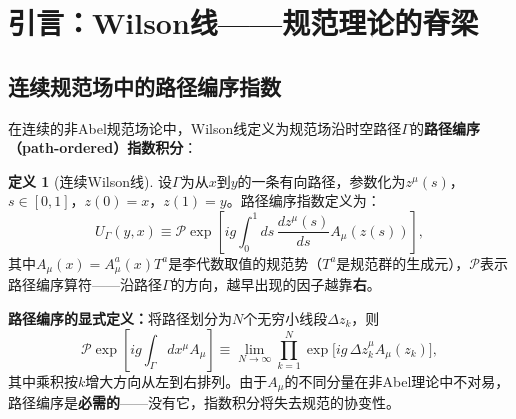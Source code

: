 \documentclass[12pt,a4paper]{ctexart}
\theoremstyle{definition}
\newtheorem{definition}{定义}[section]
\begin{document}
\begin{abstract}
最后，本文讨论了HYP涂抹（Hypercubic Smeared Link）对Wilson线的改进效果、规范固定精度对长Wilson线的影响（定量给出$\delta_F = 10^{-8}$精度下在$a=0.03$~fm格距上1.2~fm Wilson线可达12\%偏差的实证数据），以及Wilson线在重夸克有效理论（HQET）中的核心角色。

全篇以统一的数学语言（路径编序指数、规范变换性质、谱表示）将分散在本库各文献中的Wilson线知识编织成一个有机整体，为读者提供了从经典禁闭物理到前沿部分子结构的完整Wilson线理论图景。
\end{abstract}

\tableofcontents
\newpage

\section{引言：Wilson线——规范理论的脊梁}

\subsection{连续规范场中的路径编序指数}

在连续的非Abel规范场论中，Wilson线定义为规范场沿时空路径$\Gamma$的\textbf{路径编序（path-ordered）指数积分}：

\begin{definition}[连续Wilson线]
设$\Gamma$为从$x$到$y$的一条有向路径，参数化为$z^\mu(s)$，$s\in[0,1]$，$z(0)=x$，$z(1)=y$。路径编序指数定义为：
\begin{equation}
\boxed{U_\Gamma(y,x) \equiv \mathcal{P}\exp\!\left[ig\int_0^1 ds\, \frac{dz^\mu(s)}{ds} A_\mu(z(s))\right]},
\label{eq:wilson_line_continuum}
\end{equation}
其中$A_\mu(x) = A_\mu^a(x)T^a$是李代数取值的规范势（$T^a$是规范群的生成元），$\mathcal{P}$表示路径编序算符——沿路径$\Gamma$的方向，越早出现的因子越靠\textbf{右}。
\end{definition}

\textbf{路径编序的显式定义：}将路径划分为$N$个无穷小线段$\Delta z_k$，则
\begin{equation}
\mathcal{P}\exp\!\left[ig\int_\Gamma dx^\mu A_\mu\right] \equiv \lim_{N\to\infty} \prod_{k=1}^N \exp\!\big[ig\,\Delta z_k^\mu A_\mu(z_k)\big],
\label{eq:path_ordering}
\end{equation}
其中乘积按$k$增大方向从左到右排列。由于$A_\mu$的不同分量在非Abel理论中不对易，路径编序是\textbf{必需的}——没有它，指数积分将失去规范的协变性。
\end{document}
